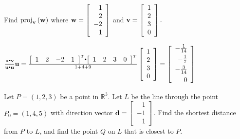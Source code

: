 \begin{enumialphparenastyle}
\begin{ex} Find $\mbox{proj}_{{\bf v}}\left( {\bf w}\right) $ where 
${\bf w}=\left[
\begin{array}{r}
1 \\
2 \\
-2 \\
1
\end{array}
\right] $ and ${\bf v}=\left[ 
\begin{array}{r}
1 \\
2 \\
3 \\
0
\end{array}
\right] .$
\begin{sol}
$\frac{\vect{u}\dotprod \vect{v}}{\vect{u}\dotprod \vect{u}}\vect{u}=\frac{\leftB \begin{array}{cccc}
1 & 2 & -2 & 1 
\end{array}
\rightB^T \dotprod \leftB \begin{array}{cccc}
1 & 2 & 3 & 0
\end{array}
\rightB^T}{1+4+9}\leftB \begin{array}{r}
1 \\
2 \\
3 \\
0
\end{array}
\rightB
=\leftB
\begin{array}{r}
-\vspace{0.05in}\frac{1}{14} \\
-\vspace{0.05in}\frac{1}{7} \\
-\vspace{0.05in}\frac{3}{14} \\
 0
\end{array}
\rightB $
\end{sol}
\end{ex}

\begin{ex} Let $P = (1,2,3)$ be a point in $\mathbb{R}^3$. Let $L$ be the line through the point $P_0 = (1, 4, 5)$ with direction vector ${\bf d} = \left[ \begin{array}{r}
1 \\
-1 \\
1
\end{array} \right]$. Find the shortest distance from $P$ to $L$, and find the point $Q$ on $L$ that is closest to $P$. 
\end{ex}


\end{enumialphparenastyle}
